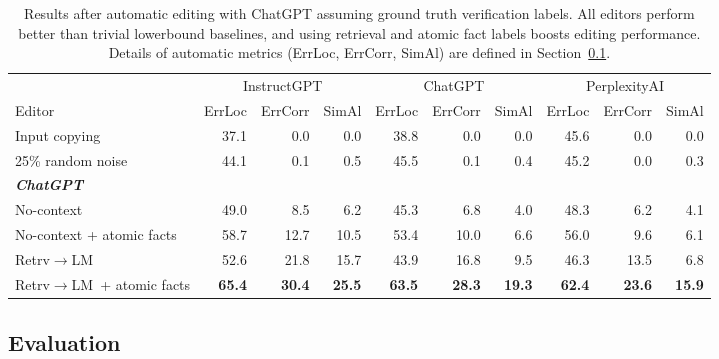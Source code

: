 \documentclass[11pt]{article}
\newcommand{\rtgShort}{Retrv$\rightarrow$LM}
\begin{document}
\begin{table}[t]
    \center \footnotesize
    \begin{tabular}{
            lrrrrrrrrr
        }
        \toprule
         & \multicolumn{3}{c}{InstructGPT} & \multicolumn{3}{c}{ChatGPT} & \multicolumn{3}{c}{PerplexityAI} \\
         \cmidrule(lr){2-4} \cmidrule(lr){5-7} \cmidrule(lr){8-10}
        Editor & ErrLoc & ErrCorr & SimAl & ErrLoc & ErrCorr & SimAl & ErrLoc & ErrCorr & SimAl  \\ 
        \midrule
        Input copying & 37.1 & 0.0 & 0.0 & 38.8 & 0.0 & 0.0 & 45.6 & 0.0 & 0.0 \\
        25\% random noise & 44.1 & 0.1 & 0.5 & 45.5 & 0.1 & 0.4 & 45.2 & 0.0 & 0.3  \\
        \midrule
        \multicolumn{5}{l}{\textbf{\em ChatGPT}} \\
        No-context & 49.0 & 8.5  &  6.2 & 45.3 & 6.8 & 4.0 & 48.3 & 6.2 & 4.1 \\
        No-context + atomic facts & 58.7 & 12.7 & 10.5 & 53.4 & 10.0  & 6.6 & 56.0 & 9.6 & 6.1 \\
        \rtgShort\ & 52.6 & 21.8 & 15.7 & 43.9 & 16.8 & 9.5 & 46.3 & 13.5 & 6.8 \\
        \rtgShort\ + atomic facts & \textbf{65.4} & \textbf{30.4} & \textbf{25.5} & \textbf{63.5} & \textbf{28.3}  & \textbf{19.3} & \textbf{62.4} & \textbf{23.6} & \textbf{15.9} \\
        \bottomrule
    \end{tabular}
    \caption{Results after automatic editing with ChatGPT assuming ground truth verification labels. All editors perform better than trivial lowerbound baselines, and using retrieval and atomic fact labels boosts editing performance. Details of automatic metrics (ErrLoc, ErrCorr, SimAl) are defined in Section~\ref{subsubsec:editing-eval}. 
    }\label{tab:editing-results}
\end{table}

\subsection{Evaluation}\label{subsubsec:editing-eval}
\end{document}
